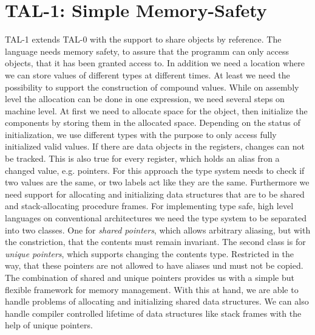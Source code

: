 \documentclass[acmlarge]{acmart}
\begin{document}
	\section{TAL-1: Simple Memory-Safety}
	TAL-1 extends TAL-0 with the support to share objects by reference. The language needs memory safety, to assure that the programm can only access objects, that it has been granted access to. In addition we need a location where we can store values of different types at different times. At least we need the possibility to support the construction of compound values. While on assembly level the allocation can be done in one expression, we need several steps on machine level.
	At first we need to allocate space for the object, then initialize the components by storing them in the allocated space. Depending on the status of initialization, we use different types with the purpose to only access fully initialized valid values.
	If there are data objects in the registers, changes can not be tracked. This is also true for every register, which holds an alias fron a changed value, e.g. pointers.
	For this approach the type system needs to check if two values are the same, or two labels act like they are the same. Furthermore we need support for allocating and initializing data structures that are to be shared and stack-allocating procedure frames.
	For implementing type safe, high level languages on conventional architectures we need the type system to be separated into two classes. One for \emph{shared pointers}, which allows arbitrary aliasing, but with the constriction, that the contents must remain invariant.
	The second class is for \emph{unique pointers}, which supports changing the contents type. Restricted in the way, that these pointers are not allowed to have aliases und must not be copied.
	The combination of shared and unique pointers provides us with a simple but flexible framework for memory management.
	With this at hand, we are able to handle problems of allocating and initializing shared data structures. We can also handle compiler controlled lifetime of data structures like stack frames with the help of unique pointers.
\end{document}
